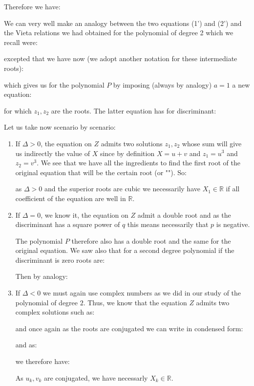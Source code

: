 	Therefore we have:
	
	We can very well make an analogy between the two equations (1') and (2') and the Vieta relations we had obtained for the polynomial of degree 2 which we recall were:
	
	excepted that we have now (we adopt another notation for these intermediate roots):
	
	which gives us for the polynomial $P$ by imposing (always by analogy) $a=1$ a new equation:
	
	for which $z_1,z_2$ are the roots.
	The latter equation has for discriminant:
	
	Let us take now scenario by scenario:
	\begin{enumerate}
		\item If $\Delta >0$, the equation on $Z$ admits two solutions $z_1,z_2$ whose sum will give us indirectly the value of $X$ since by definition $X=u+v$ and $z_1=u^3$ and $z_2=v^3$. We see that we have all the ingredients to find the first root of the original equation that will be the certain root (or ""). So:
		
		as $\Delta>0$ and the superior roots are cubic we necessarily have $X_1\in \mathbb{R}$ if all coefficient of the equation are well in $\mathbb{R}$.
		
		\item If $\Delta=0$, we know it, the equation on $Z$ admit a double root and as the discriminant has a square power of $q$ this means necessarily that $p$ is negative.

		The polynomial $P$ therefore also has a double root and the same for the original equation. We saw also that for a second degree polynomial if the discriminant is zero roots are:
		
		Then by analogy:
		
		
		\item If $\Delta<0$ we must again use complex numbers as we did in our study of the polynomial of degree $2$. Thus, we know that the equation $Z$ admits two complex solutions such as:
		
		and once again as the roots are conjugated we can write in condensed form:
		
		and as:
		
		we therefore have:
		
		As $u_k,v_k$ are conjugated, we have necessarly $X_k\in \mathbb{R}$.
	\end{enumerate}
	
